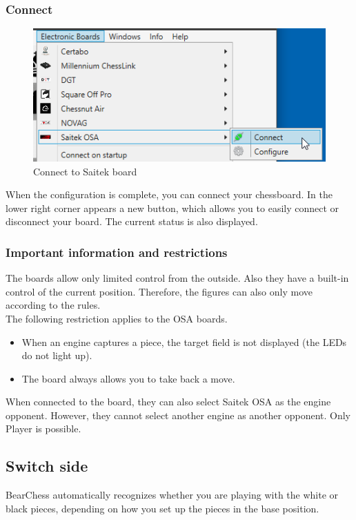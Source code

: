 \documentclass[11pt,a4paper]{article}
\begin{document}
\subsubsection{Connect}
\begin{figure}[H]
	\centering
	\includegraphics[scale=1.0]{Saitek3.png}
	\caption{Connect to Saitek board}
	\label{fig:Saitek3}
\end{figure}
When the configuration is complete, you can connect your chessboard.
In the lower right corner appears a new button, which allows you to easily connect or disconnect your board. The current status is also displayed.

\subsubsection{Important information and restrictions} \label{InformationOSA}
The boards allow only limited control from the outside. Also they have a built-in control of the current position. Therefore, the figures can also only move according to the rules.\\
The following restriction applies to the OSA boards.

\begin{itemize}
	\item When an engine captures a piece, the target field is not displayed (the LEDs do not light up). 
	\item The board always allows you to take back a move.
\end{itemize}

When connected to the board, they can also select Saitek OSA as the engine opponent.
However, they cannot select another engine as another opponent. Only Player is possible.

\subsection{Switch side}
BearChess automatically recognizes whether you are playing with the white or black pieces, depending on how you set up the pieces in the base position.\\
\end{document}
